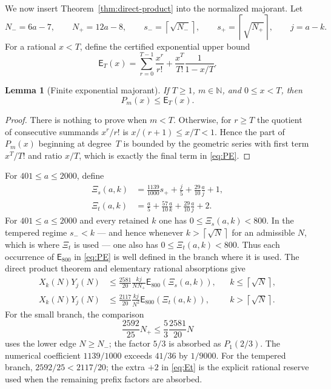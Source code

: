 \documentclass[11pt]{article}
\newtheorem{lemma}[theorem]{Lemma}
\theoremstyle{definition}
\theoremstyle{remark}
\newcommand{\PE}{\mathsf E}
\newcommand{\ceil}[1]{\left\lceil #1\right\rceil}
\begin{document}
We now insert Theorem~\ref{thm:direct-product} into the normalized majorant.
Let
\[
  N_-=6a-7,
  \qquad N_+=12a-8,
  \qquad s_-=\ceil{\sqrt{N_-}},
  \qquad s_+=\ceil{\sqrt{N_+}},
  \qquad j=a-k.
\]
For a rational $x<T$, define the certified exponential upper bound
\begin{equation}\label{eq:PE}
  \PE_T(x)=\sum_{r=0}^{T-1}\frac{x^r}{r!}
       +\frac{x^T}{T!}\frac1{1-x/T}.
\end{equation}

\begin{lemma}[Finite exponential majorant]\label{lem:finite-exp-majorant}
If $T\ge1$, $m\in\mathbb N$, and $0\le x<T$, then
\begin{equation}\label{eq:finite-exp-majorant}
  P_m(x)\le\PE_T(x).
\end{equation}
\end{lemma}

\begin{proof}
There is nothing to prove when $m<T$.  Otherwise, for $r\ge T$ the quotient
of consecutive summands $x^r/r!$ is $x/(r+1)\le x/T<1$.  Hence the part of
$P_m(x)$ beginning at degree~$T$ is bounded by the geometric series with first
term $x^T/T!$ and ratio $x/T$, which is exactly the final term in
\eqref{eq:PE}.
\end{proof}

For $401\le a\le2000$, define
\begin{align}
 \Xi_s(a,k)&=\frac{1139}{1000}s_++\frac j5+
             \frac{29}{10}\frac aj+1,
 \label{eq:Es}\\
 \Xi_t(a,k)&=\frac a5+\frac{57}{10}\frac ak+
             \frac{29}{10}\frac aj+2.
 \label{eq:Et}
\end{align}
For $401\le a\le2000$ and every retained $k$ one has $0\le \Xi_s(a,k)<800$.  In
the tempered regime $s_-<k$ --- and hence whenever $k>\ceil{\sqrt N}$ for an
admissible $N$, which is where $\Xi_t$ is used --- one also has
$0\le \Xi_t(a,k)<800$.  Thus each
occurrence of $\PE_{800}$ in \eqref{eq:PE} is well defined in the branch where
it is used.
The direct product theorem and elementary rational absorptions give
\begin{align}
 X_k(N)Y_j(N)
 &\le\frac{2581}{20}\frac{kj}{NN_+}\PE_{800}(\Xi_s(a,k)),
 &&k\le\ceil{\sqrt N},
 \label{eq:XY-small}\\
 X_k(N)Y_j(N)
 &\le\frac{2117}{20}\frac{kj}{N^2}\PE_{800}(\Xi_t(a,k)),
 &&k>\ceil{\sqrt N}.
 \label{eq:XY-tempered}
\end{align}
For the small branch, the comparison
\[
 \frac{2592}{25}N_+
 \le\frac53\frac{2581}{20}N
\]
uses the lower edge $N\ge N_-$; the factor $5/3$ is absorbed as
$P_1(2/3)$.  The numerical coefficient
$1139/1000$ exceeds $41/36$ by $1/9000$.  For the tempered branch,
$2592/25<2117/20$; the extra $+2$ in \eqref{eq:Et} is the explicit rational reserve used when the remaining prefix factors are absorbed.
\end{document}
